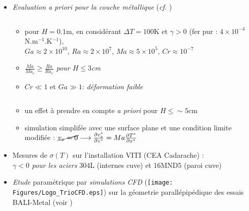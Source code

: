 \begin{frame}[fragile]
\begin{itemize}
\item \emph{Evaluation \textit{a priori} pour la couche métallique} (\textit{cf.} \cite{Saas2017})
\begin{columns}[T]
    \begin{column}{0.6\textwidth}
    \baselineskip
    \begin{itemize}
\item pour $H=0.1$m, en considérant $\Delta T = 100$K et \emph{$\gamma>0$} (fer pur : $4\times 10^{-4}$N.m$^{-1}$.K$^{-1}$), \\
$Ga\approx 2\times 10^{10}$, $Ra\approx 2\times 10^{7}$, $Ma\approx 5\times 10^{5}$, $Cr\approx 10^{-7}$
\item \emph{$\frac{Ma}{Ma_c}\ge\frac{Ra}{Ra_c}$ pour $H\le 3$cm}
\item $Cr\ll 1$ et $Ga\gg 1$: \emph{déformation faible}
\end{itemize}
    \end{column}
    \end{columns}
    \begin{itemize}
    \item un effet à prendre en compte \textit{a priori} pour $H \le \sim 5$cm
    \item simulation simplifée avec une surface plane et une condition limite modifiée : $\cancel{v_x=0} \longrightarrow \frac{\partial v_x^\ast}{\partial z^\ast} = Ma \frac{\partial T^\ast}{\partial x^\ast}$
    \end{itemize}
\item Mesures de $\sigma(T)$ sur l'installation VITI (CEA Cadarache) \cite{Chikhi2019} : \\ \emph{$\gamma<0$ pour les aciers} 304L (internes cuve) et 16MND5 (paroi cuve)
\item \emph{Etude} paramétrique par \emph{simulations CFD} (\texttt{[image: Figures/Logo\_TrioCFD.eps]}) sur la géometrie parallépipédique des essais BALI-Metal (voir \cite{Peybernes2019})
\end{itemize}
\end{frame}
